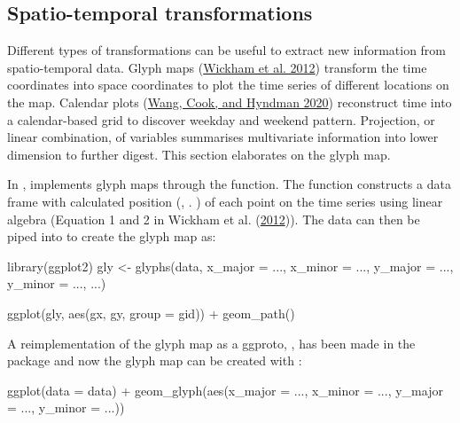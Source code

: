 \documentclass{article}
\newenvironment{Shaded}{\begin{snugshade}}{\end{snugshade}}
\newcommand{\AttributeTok}[1]{\textcolor[rgb]{0.77,0.63,0.00}{#1}}
\newcommand{\FunctionTok}[1]{\textcolor[rgb]{0.00,0.00,0.00}{#1}}
\newcommand{\NormalTok}[1]{#1}
\newcommand{\OtherTok}[1]{\textcolor[rgb]{0.56,0.35,0.01}{#1}}
\newcommand{\SpecialCharTok}[1]{\textcolor[rgb]{0.00,0.00,0.00}{#1}}
\begin{document}
\hypertarget{st_transformation}{%
\subsection{Spatio-temporal transformations}\label{st_transformation}}

Different types of transformations can be useful to extract new information from spatio-temporal data. Glyph maps (\protect\hyperlink{ref-Wickham2012-yr}{Wickham et al. 2012}) transform the time coordinates into space coordinates to plot the time series of different locations on the map. Calendar plots (\protect\hyperlink{ref-wang2020calendar}{Wang, Cook, and Hyndman 2020}) reconstruct time into a calendar-based grid to discover weekday and weekend pattern. Projection, or linear combination, of variables summarises multivariate information into lower dimension to further digest. This section elaborates on the glyph map.

In ,  implements glyph maps through the  function. The function constructs a data frame with calculated position (, . ) of each point on the time series using linear algebra (Equation 1 and 2 in Wickham et al. (\protect\hyperlink{ref-Wickham2012-yr}{2012})). The data can then be piped into  to create the glyph map as:

\begin{Shaded}
\begin{Highlighting}[]
\FunctionTok{library}\NormalTok{(ggplot2)}
\NormalTok{gly }\OtherTok{\textless{}{-}} \FunctionTok{glyphs}\NormalTok{(data,}
              \AttributeTok{x\_major =}\NormalTok{ ..., }\AttributeTok{x\_minor =}\NormalTok{ ...,}
              \AttributeTok{y\_major =}\NormalTok{ ..., }\AttributeTok{y\_minor =}\NormalTok{ ..., ...)}

\FunctionTok{ggplot}\NormalTok{(gly, }\FunctionTok{aes}\NormalTok{(gx, gy, }\AttributeTok{group =}\NormalTok{ gid)) }\SpecialCharTok{+}
  \FunctionTok{geom\_path}\NormalTok{()}
\end{Highlighting}
\end{Shaded}

A reimplementation of the glyph map as a ggproto, , has been made in the  package and now the glyph map can be created with :

\begin{Shaded}
\begin{Highlighting}[]
\FunctionTok{ggplot}\NormalTok{(}\AttributeTok{data =}\NormalTok{ data) }\SpecialCharTok{+}
  \FunctionTok{geom\_glyph}\NormalTok{(}\FunctionTok{aes}\NormalTok{(}\AttributeTok{x\_major =}\NormalTok{ ..., }\AttributeTok{x\_minor =}\NormalTok{ ...,}
                 \AttributeTok{y\_major =}\NormalTok{ ..., }\AttributeTok{y\_minor =}\NormalTok{ ...))}
\end{Highlighting}
\end{Shaded}
\end{document}

